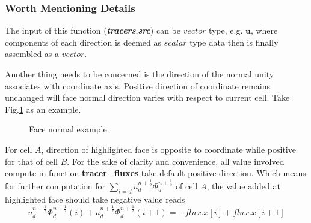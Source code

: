 \documentclass[a4paper]{article}
\newcommand{\func}[1]{\textbf{\textcolor{function}{#1}}}
\newcommand{\para}[1]{\textbf{\emph{\textcolor{para}{#1}}}}
\begin{document}
\subsubsection{Worth Mentioning Details}\label{sec:direction}
The input of this function (\para{tracers},\para{src}) can be $vector$ type, e.g. $\mathbf{u}$, where components of each direction is deemed as $scalar$ type data then is finally assembled as a $vector$.\par
Another thing needs to be concerned is the direction of the normal unity associates with coordinate axis. Positive direction of coordinate remains unchanged will face normal direction varies with respect to current cell. Take Fig.\ref{fig:facenormal} as an example. 
\begin{figure}[H]
  \centering
    \caption{Face normal example.}
    \label{fig:facenormal}
\end{figure}
For cell $A$, direction of highlighted face is opposite to coordinate while positive for that of cell $B$. For the sake of clarity and convenience, all value involved compute in function \func{tracer\_fluxes} take default positive direction. Which means for further computation for $\sum_{i=d}u_d^{n+ \frac{1}{2}}\Phi_d^{n+ \frac{1}{2}}$ of cell $A$, the value added at highlighted face should take negative value reads 
\begin{equation}
  u_d^{n+ \frac{1}{2}}\Phi_d^{n + \frac{1}{2}}(i)+u_d^{n+ \frac{1}{2}}\Phi_d^{n + \frac{1}{2}}(i+1) = -flux.x[i]+flux.x[i+1]
\end{equation}

\newpage
\end{document}
